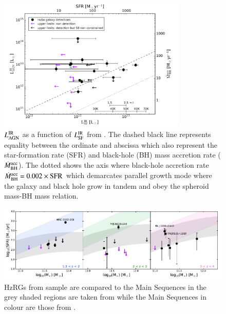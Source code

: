 \begin{figure}[!ht]
	\centering
    \includegraphics[width=0.8\textwidth]{plots_chp1/SFR_AGN_LIR_Falkendal_2019.png}
    \caption[AGN vs SF luminosity from \citet{falkendal2019}]{$L^{\rm IR}_{\rm AGN}$ as a function of $L^{\rm IR}_{\rm SF}$ from \citet{falkendal2019}. The dashed black line represents equality between the ordinate and abscissa which also represent the star-formation rate (SFR) and black-hole (BH) mass accretion rate ($\dot{M}^{\rm acc}_{\rm BH}$). The dotted shows the axis where black-hole accretion rate $\dot{M}^{\rm acc}_{\rm BH} = 0.002 \times \rm SFR$ which demarcates parallel growth mode where the galaxy and black hole grow in tandem and obey the spheroid mass-BH mass relation.}
    \label{fig:SFR_AGN_LIR-Falkendal}
\end{figure}

\begin{figure}[!ht]
   \centering
   \includegraphics[width=\textwidth]{plots_chp1/HzRGs_main_sequence_Falkendal2019.png}
   \caption[HzRGs relative to Main Sequence in \citet{falkendal2019}]{HzRGs from \citet{falkendal2019} sample are compared to the Main Sequences in the grey shaded regions are taken from \citet{Schreiber2015} while the Main Sequences in colour are those from \citet{Santini2017}.}
   \label{fig:HzRGs-MS-Falkendal2019}
\end{figure}

